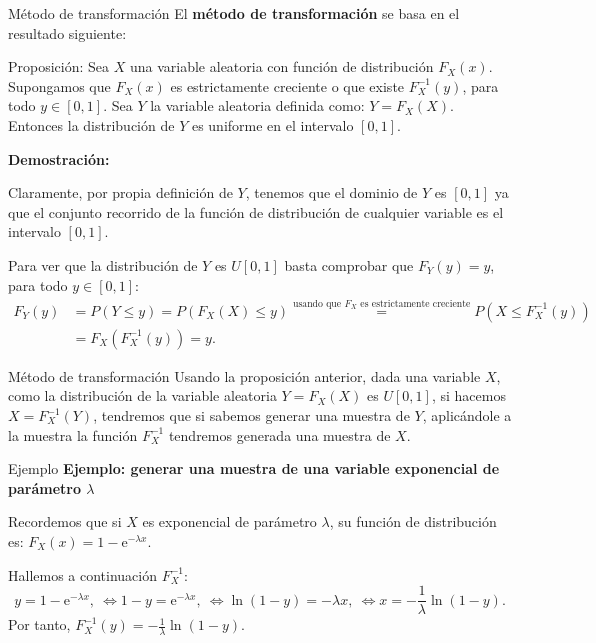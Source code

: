 \documentclass[
  ignorenonframetext,
  aspectratio=169]{beamer}
\begin{document}
\begin{frame}{Método de transformación}
\protect\hypertarget{muxe9todo-de-transformaciuxf3n}{}
El \textbf{método de transformación} se basa en el resultado siguiente:

Proposición: Sea \(X\) una variable aleatoria con función de
distribución \(F_X(x)\). Supongamos que \(F_X(x)\) es estrictamente
creciente o que existe \(F_X^{-1}(y)\), para todo \(y\in [0,1]\). Sea
\(Y\) la variable aleatoria definida como: \(Y=F_X(X)\). Entonces la
distribución de \(Y\) es uniforme en el intervalo \([0,1]\).

\textbf{Demostración:}

Claramente, por propia definición de \(Y\), tenemos que el dominio de
\(Y\) es \([0,1]\) ya que el conjunto recorrido de la función de
distribución de cualquier variable es el intervalo \([0,1]\).

Para ver que la distribución de \(Y\) es \(U[0,1]\) basta comprobar que
\(F_Y(y)=y\), para todo \(y\in [0,1]\): \[
\begin{array}{rl}
F_Y(y) & =P(Y\leq y)=P(F_X(X)\leq y)\stackrel{\mbox{usando que $F_X$ es estrictamente creciente}}{=} P(X\leq F_X^{-1}(y)) \\ & =F_X(F_X^{-1}(y))=y.
\end{array}
\]
\end{frame}

\begin{frame}{Método de transformación}
\protect\hypertarget{muxe9todo-de-transformaciuxf3n-1}{}
Usando la proposición anterior, dada una variable \(X\), como la
distribución de la variable aleatoria \(Y=F_X(X)\) es \(U[0,1]\), si
hacemos \(X=F_X^{-1}(Y)\), tendremos que si sabemos generar una muestra
de \(Y\), aplicándole a la muestra la función \(F_X^{-1}\) tendremos
generada una muestra de \(X\).
\end{frame}

\begin{frame}{Ejemplo}
\protect\hypertarget{ejemplo-4}{}
\textbf{Ejemplo: generar una muestra de una variable exponencial de
parámetro \(\lambda\)}

Recordemos que si \(X\) es exponencial de parámetro \(\lambda\), su
función de distribución es: \(F_X(x)=1-\mathrm{e}^{-\lambda x}\).

Hallemos a continuación \(F_X^{-1}\): \[
y=1-\mathrm{e}^{-\lambda x},\ \Leftrightarrow 1-y=\mathrm{e}^{-\lambda x},\ \Leftrightarrow \ln(1-y)=-\lambda x,\ \Leftrightarrow x=-\frac{1}{\lambda}\ln(1-y).
\] Por tanto, \(F_X^{-1}(y)=-\frac{1}{\lambda}\ln(1-y)\).
\end{frame}
\end{document}
